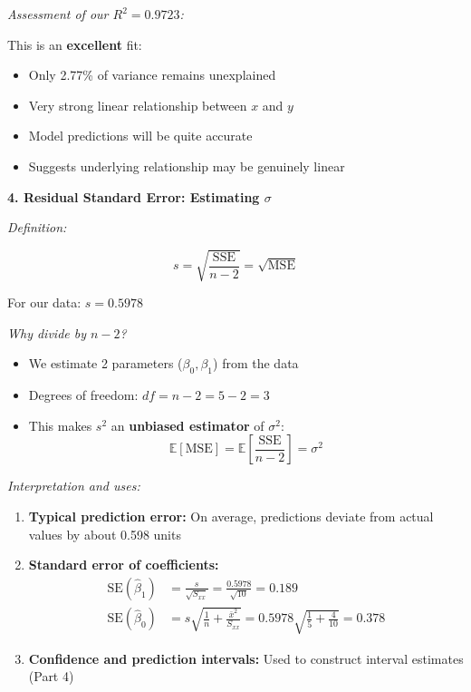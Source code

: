 \documentclass[12pt]{article}
\begin{document}
\begin{explanation}
\textit{Assessment of our $R^2 = 0.9723$:}

This is an \textbf{excellent} fit:
\begin{itemize}
    \item Only 2.77\% of variance remains unexplained
    \item Very strong linear relationship between $x$ and $y$
    \item Model predictions will be quite accurate
    \item Suggests underlying relationship may be genuinely linear
\end{itemize}

\textbf{4. Residual Standard Error: Estimating $\sigma$}

\textit{Definition:}

\[
s = \sqrt{\frac{\text{SSE}}{n-2}} = \sqrt{\text{MSE}}
\]

For our data: $s = 0.5978$

\textit{Why divide by $n-2$?}

\begin{itemize}
    \item We estimate 2 parameters ($\beta_0, \beta_1$) from the data
    \item Degrees of freedom: $df = n - 2 = 5 - 2 = 3$
    \item This makes $s^2$ an \textbf{unbiased estimator} of $\sigma^2$:
    \[
    \mathbb{E}[\text{MSE}] = \mathbb{E}\left[\frac{\text{SSE}}{n-2}\right] = \sigma^2
    \]
\end{itemize}

\textit{Interpretation and uses:}

\begin{enumerate}
    \item \textbf{Typical prediction error:} On average, predictions deviate from actual values by about 0.598 units

    \item \textbf{Standard error of coefficients:}
    \begin{align*}
    \text{SE}(\hat{\beta}_1) &= \frac{s}{\sqrt{S_{xx}}} = \frac{0.5978}{\sqrt{10}} = 0.189 \\
    \text{SE}(\hat{\beta}_0) &= s\sqrt{\frac{1}{n} + \frac{\bar{x}^2}{S_{xx}}} = 0.5978\sqrt{\frac{1}{5} + \frac{4}{10}} = 0.378
    \end{align*}

    \item \textbf{Confidence and prediction intervals:} Used to construct interval estimates (Part 4)


\end{enumerate}
\end{explanation}
\end{document}
